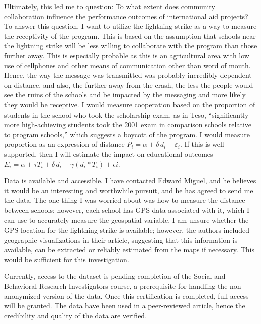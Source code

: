 \documentclass{article}
\begin{document}
Ultimately, this led me to question: To what extent does community collaboration influence the performance outcomes of international aid projects? To answer this question, I want to utilize the lightning strike as a way to measure the receptivity of the program. This is based on the assumption that schools near the lightning strike will be less willing to collaborate with the program than those further away. This is especially probable as this is an agricultural area with low use of cellphones and other means of communication other than word of mouth. Hence, the way the message was transmitted was probably incredibly dependent on distance, and also, the further away from the crash, the less the people would see the ruins of the schools and be impacted by the messaging and more likely they would be receptive. I would measure cooperation based on the proportion of students in the school who took the scholarship exam, as in Teso, “significantly more high-achieving students took the 2001 exam in comparison schools relative to program schools,” which suggests a boycott of the program. I would measure proportion as an expression of distance $P_i = \alpha + \delta\, d_i + \varepsilon_i$. If this is well supported, then I will estimate the impact on educational outcomes  $E_i= \alpha + \tau T_i+ \delta\,d_i +  \gamma (d_i*T_i) +\epsilon i$. 

Data is available and accessible. I have contacted Edward Miguel, and he believes it would be an interesting and worthwhile pursuit, and he has agreed to send me the data. The one thing I was worried about was how to measure the distance between schools; however, each school has GPS data associated with it, which I can use to accurately measure the geospatial variable. I am unsure whether the GPS location for the lightning strike is available; however, the authors included geographic visualizations in their article, suggesting that this information is available, can be extracted or reliably estimated from the maps if necessary. This would be sufficient for this investigation. 

Currently, access to the dataset is pending completion of the Social and Behavioral Research Investigators course, a prerequisite for handling the non-anonymized version of the data. Once this certification is completed, full access will be granted. The data have been used in a peer-reviewed article, hence the credibility and quality of the data are verified. 
\end{document}
